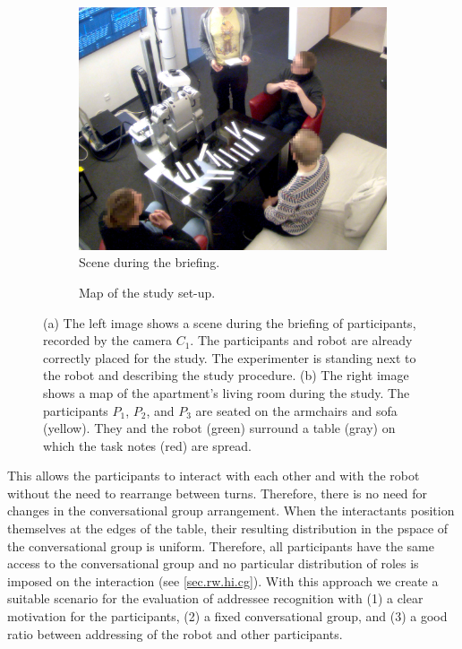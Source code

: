 \begin{figure}[tbh]
    \centering
    \begin{subfigure}[t]{0.49\textwidth}
        \includegraphics[trim=55 0 80 0, clip, width=\textwidth]{figures/addressee-meka-intro.jpg}
        \caption{Scene during the briefing.}
        \label{fig:meka-intro-shot}
    \end{subfigure}
    \hfill
    \begin{subfigure}[t]{0.49\textwidth}
        \def\svgwidth{1.0\textwidth}
        
        \caption{Map of the study set-up.}
        \label{fig:meka-map}
    \end{subfigure}
    \caption[Configuration during robot addressing study.]{\label{fig:meka-intro}
    (a) The left image shows a scene during the briefing of participants, recorded by the camera \(C_1\).
    The participants and \gls{robot} are already correctly placed for the study.
    The experimenter is standing next to the \gls{robot} and describing the study procedure.
    (b) The right image shows a map of the \gls{apartment}'s living room during the study.
    The participants \(P_1\), \(P_2\), and \(P_3\) are seated on the armchairs and sofa (yellow).
    They and the \gls{robot} (green) surround a table (gray) on which the task notes (red) are spread.
    }
\end{figure}
This allows the participants to interact with each other and with the \gls{robot} without the need to rearrange between \glspl{turn}.
Therefore, there is no need for changes in the \gls{conversational group} arrangement.
When the interactants position themselves at the edges of the table, their resulting distribution in the \gls{pspace} of the \gls{conversational group} is uniform.
Therefore, all participants have the same access to the \gls{conversational group} and no particular distribution of roles is imposed on the interaction (see \cref{sec.rw.hi.cg}).
With this approach we create a suitable scenario for the evaluation of  \gls{addressee} recognition with (1) a clear motivation for the participants, (2) a fixed \gls{conversational group}, and (3) a good ratio between addressing of the \gls{robot} and other participants.


